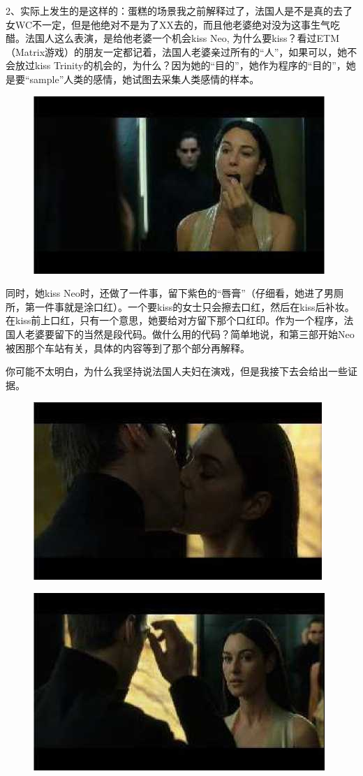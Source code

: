 \documentclass[UTF8]{ctexart}
\begin{document}
2、实际上发生的是这样的：蛋糕的场景我之前解释过了，法国人是不是真的去了女WC不一定，但是他绝对不是为了XX去的，而且他老婆绝对没为这事生气吃醋。法国人这么表演，是给他老婆一个机会kiss Neo, 为什么要kiss？看过ETM（Matrix游戏）的朋友一定都记着，法国人老婆亲过所有的“人”，如果可以，她不会放过kiss Trinity的机会的，为什么？因为她的“目的”，她作为程序的“目的”，她是要“sample”人类的感情，她试图去采集人类感情的样本。

\begin{figure}[htb]
\centering
\includegraphics[width=0.5\linewidth]{fig/read_reloaded-104}
\end{figure}

同时，她kiss Neo时，还做了一件事，留下紫色的“唇膏”（仔细看，她进了男厕所，第一件事就是涂口红）。一个要kiss的女士只会擦去口红，然后在kiss后补妆。在kiss前上口红，只有一个意思，她要给对方留下那个口红印。作为一个程序，法国人老婆要留下的当然是段代码。做什么用的代码？简单地说，和第三部开始Neo被困那个车站有关，具体的内容等到了那个部分再解释。

你可能不太明白，为什么我坚持说法国人夫妇在演戏，但是我接下去会给出一些证据。

\begin{figure}[htb]
\centering
\includegraphics[width=0.5\linewidth]{fig/read_reloaded-105}
\end{figure}

\begin{figure}[htb]
\centering
\includegraphics[width=0.5\linewidth]{fig/read_reloaded-106}
\end{figure}
\end{document}
